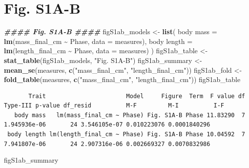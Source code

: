 \documentclass[
  landscape]{article}
\newenvironment{Shaded}{\begin{snugshade}}{\end{snugshade}}
\newcommand{\AttributeTok}[1]{\textcolor[rgb]{0.13,0.29,0.53}{#1}}
\newcommand{\DocumentationTok}[1]{\textcolor[rgb]{0.56,0.35,0.01}{\textbf{\textit{#1}}}}
\newcommand{\FunctionTok}[1]{\textcolor[rgb]{0.13,0.29,0.53}{\textbf{#1}}}
\newcommand{\NormalTok}[1]{#1}
\newcommand{\OtherTok}[1]{\textcolor[rgb]{0.56,0.35,0.01}{#1}}
\newcommand{\SpecialCharTok}[1]{\textcolor[rgb]{0.81,0.36,0.00}{\textbf{#1}}}
\newcommand{\StringTok}[1]{\textcolor[rgb]{0.31,0.60,0.02}{#1}}
\begin{document}
\section{Fig. S1A-B}\label{fig.-s1a-b}

\begin{Shaded}
\begin{Highlighting}[]
\DocumentationTok{\#\#\#\# Fig. S1A{-}B \#\#\#\#}
\NormalTok{figS1ab\_models }\OtherTok{\textless{}{-}} \FunctionTok{list}\NormalTok{(}
  \StringTok{\textasciigrave{}}\AttributeTok{body mass}\StringTok{\textasciigrave{}}   \OtherTok{=} \FunctionTok{lm}\NormalTok{(mass\_final\_cm }\SpecialCharTok{\textasciitilde{}}\NormalTok{ Phase, }\AttributeTok{data =}\NormalTok{ measures),}
  \StringTok{\textasciigrave{}}\AttributeTok{body length}\StringTok{\textasciigrave{}} \OtherTok{=} \FunctionTok{lm}\NormalTok{(length\_final\_cm }\SpecialCharTok{\textasciitilde{}}\NormalTok{ Phase, }\AttributeTok{data =}\NormalTok{ measures)}
\NormalTok{)}
\NormalTok{figS1ab\_table }\OtherTok{\textless{}{-}} \FunctionTok{stat\_table}\NormalTok{(figS1ab\_models, }\StringTok{"Fig. S1A{-}B"}\NormalTok{)}
\NormalTok{figS1ab\_summary }\OtherTok{\textless{}{-}} \FunctionTok{mean\_se}\NormalTok{(measures, }\FunctionTok{c}\NormalTok{(}\StringTok{"mass\_final\_cm"}\NormalTok{, }\StringTok{"length\_final\_cm"}\NormalTok{))}
\NormalTok{figS1ab\_fold }\OtherTok{\textless{}{-}} \FunctionTok{fold\_table}\NormalTok{(measures, }\FunctionTok{c}\NormalTok{(}\StringTok{"mass\_final\_cm"}\NormalTok{, }\StringTok{"length\_final\_cm"}\NormalTok{))}
\NormalTok{figS1ab\_table}
\end{Highlighting}
\end{Shaded}

\begin{verbatim}
       Trait                       Model     Figure  Term  F value df Type-III p-value df_resid          M-F         M-I          I-F
   body mass   lm(mass_final_cm ~ Phase) Fig. S1A-B Phase 11.83290  7     1.945936e-06       24 3.546105e-07 0.010223076 0.0001840296
 body length lm(length_final_cm ~ Phase) Fig. S1A-B Phase 10.04592  7     7.941807e-06       24 2.907316e-06 0.002669327 0.0070832986
\end{verbatim}

\begin{Shaded}
\begin{Highlighting}[]
\NormalTok{figS1ab\_summary}
\end{Highlighting}
\end{Shaded}
\end{document}
